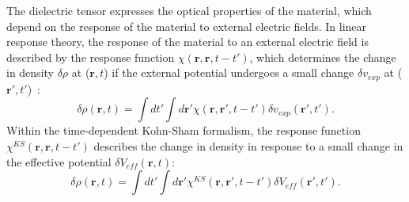\begin{refsection}
The dielectric tensor expresses the optical properties of the material, which 
depend on the response of the material to external electric fields. In linear 
response theory, the response of the material to an external electric field is 
described by the response function $\chi(\mathbf{r},\mathbf{r}, t - t')$, 
which determines the change in density $\delta \rho$ at ($\mathbf{r},t$) if the 
external potential undergoes a small change $\delta v_{exp}$ at 
($\mathbf{r}',t'$)~\cite{Harl2008}: 
\begin{equation}\label{dft:eq-response} 
\delta \rho (\mathbf{r},t) = \int dt' \int d\mathbf{r}' 
\chi(\mathbf{r},\mathbf{r}', t - t') \delta v_{exp} (\mathbf{r}',t'). 
\end{equation} 
Within the time-dependent Kohn-Sham formalism, the response function 
$\chi^{KS}(\mathbf{r},\mathbf{r}, t - t')$ describes the change in density in 
response to a small change in the effective potential $\delta 
V_{eff}(\mathbf{r},t)$: 
\begin{equation}\label{dft:eq-KSresponse} 
\delta \rho (\mathbf{r},t) = \int dt' \int d\mathbf{r}' 
\chi^{KS}(\mathbf{r},\mathbf{r}', t - t') \delta V_{eff} (\mathbf{r}',t'). 
\end{equation} 
 

\end{refsection}
